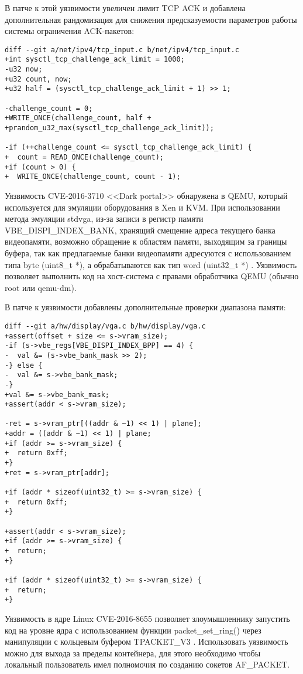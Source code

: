 В патче к этой уязвимости увеличен лимит TCP ACK и добавлена дополнительная рандомизация для снижения предсказуемости параметров работы системы ограничения ACK-пакетов:
\begin{lstlisting}
diff --git a/net/ipv4/tcp_input.c b/net/ipv4/tcp_input.c
+int sysctl_tcp_challenge_ack_limit = 1000;
-u32 now;
+u32 count, now;
+u32 half = (sysctl_tcp_challenge_ack_limit + 1) >> 1;

-challenge_count = 0;
+WRITE_ONCE(challenge_count, half +
+prandom_u32_max(sysctl_tcp_challenge_ack_limit));

-if (++challenge_count <= sysctl_tcp_challenge_ack_limit) {
+  count = READ_ONCE(challenge_count);
+if (count > 0) {
+  WRITE_ONCE(challenge_count, count - 1);
\end{lstlisting}

Уязвимость CVE-2016-3710 <<Dark portal>> обнаружена в QEMU, который используется для эмуляции оборудования в Xen и KVM.
При использовании метода эмуляции stdvga, из-за записи в регистр памяти VBE\_DISPI\_INDEX\_BANK, хранящий смещение адреса текущего банка видеопамяти, возможно обращение к областям памяти, выходящим за границы буфера, так как предлагаемые банки видеопамяти адресуются с использованием типа byte (uint8\_t *), а обрабатываются как тип word (uint32\_t *) \cite{qemu}.
Уязвимость позволяет выполнить код на хост-система с правами обработчика QEMU (обычно root или qemu-dm).

В патче к уязвимости добавлены дополнительные проверки диапазона памяти:
\begin{lstlisting}
diff --git a/hw/display/vga.c b/hw/display/vga.c
+assert(offset + size <= s->vram_size);
-if (s->vbe_regs[VBE_DISPI_INDEX_BPP] == 4) {
-  val &= (s->vbe_bank_mask >> 2);
-} else {
-  val &= s->vbe_bank_mask;
-}
+val &= s->vbe_bank_mask;
+assert(addr < s->vram_size);

-ret = s->vram_ptr[((addr & ~1) << 1) | plane];
+addr = ((addr & ~1) << 1) | plane;
+if (addr >= s->vram_size) {
+  return 0xff;
+}
+ret = s->vram_ptr[addr];

+if (addr * sizeof(uint32_t) >= s->vram_size) {
+  return 0xff;
+}

+assert(addr < s->vram_size);
+if (addr >= s->vram_size) {
+  return;
+}

+if (addr * sizeof(uint32_t) >= s->vram_size) {
+  return;
+}
\end{lstlisting}

Уязвимость в ядре Linux CVE-2016-8655 позволяет злоумышленнику запустить код на уровне ядра с использованием функции packet\_set\_ring() через манипуляции с кольцевым буфером TPACKET\_V3 \cite{netraw}.
Использовать уязвимость можно для выхода за пределы контейнера, для этого необходимо чтобы локальный пользователь имел полномочия по созданию сокетов AF\_PACKET.

